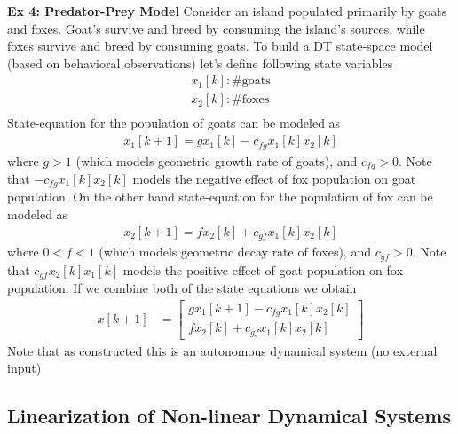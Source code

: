 \documentclass[twoside]{article}
\begin{document}
\textbf{Ex 4: Predator-Prey Model}
%
Consider an island populated primarily by goats and foxes. Goat's
survive and breed by consuming the island's sources, while foxes
survive and breed by consuming goats. To build a DT state-space model
(based on behavioral observations) let's define following state
variables
%
  \begin{align*}
    x_1[k] : \# \mathrm{goats} \\
    x_2[k] : \# \mathrm{foxes} \\
  \end{align*}
%
State-equation for the population of goats can be modeled as
%
  \begin{align*}
    x_1[k+1] = g x_1[k] - c_{fg} x_1[k] x_2[k] 
  \end{align*}
%
where $g > 1$ (which models geometric growth rate of goats), and
$c_{fg} > 0$. Note that $- c_{fg} x_1[k] x_2[k] $ models the negative
effect of fox population on goat population. On the other hand 
state-equation for the population of fox can be modeled as
%
  \begin{align*}
    x_2[k+1] = f x_2[k] + c_{gf} x_1[k] x_2[k] 
  \end{align*}
%
where $0 < f < 1$ (which models geometric decay rate of foxes), and
$c_{gf} > 0$. Note that $c_{gf} x_2[k] x_1[k] $ models the positive
effect of goat population on fox population. If we combine both of the 
state equations we obtain
%
\begin{align*}
	x[k+1] &= \left[ \begin{array}{c} g x_1[k+1] - c_{fg} x_1[k] x_2[k]   \\ 
                          f x_2[k] + c_{gf} x_1[k] x_2[k]  \end{array} \right] 
\end{align*}
%
Note that as constructed this is an autonomous dynamical system (no
external input)

\subsection{Linearization of Non-linear Dynamical Systems}
\end{document}

